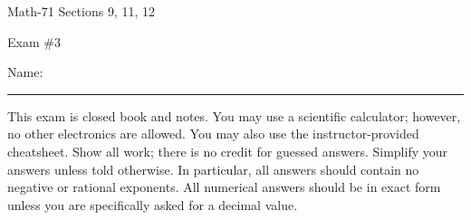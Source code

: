 \documentclass[letterpaper,12pt,fleqn]{article}
\begin{document}
\begin{center}
  \large
  Math-71 Sections 9, 11, 12

  \Large
  Exam \#3
\end{center}

\vspace{0.5in}

Name: \rule{4in}{1pt}

\vspace{0.5in}

This exam is closed book and notes. You may use a scientific calculator; however, no other electronics are allowed.  You may
also use the instructor-provided cheatsheet.  Show all work; there is no credit for guessed answers.  Simplify your answers
unless told otherwise.  In particular, all answers should contain no negative or rational exponents.  All numerical answers
should be in exact form unless you are specifically asked for a decimal value.

\vspace{0.5in}

\newpage
\end{document}
